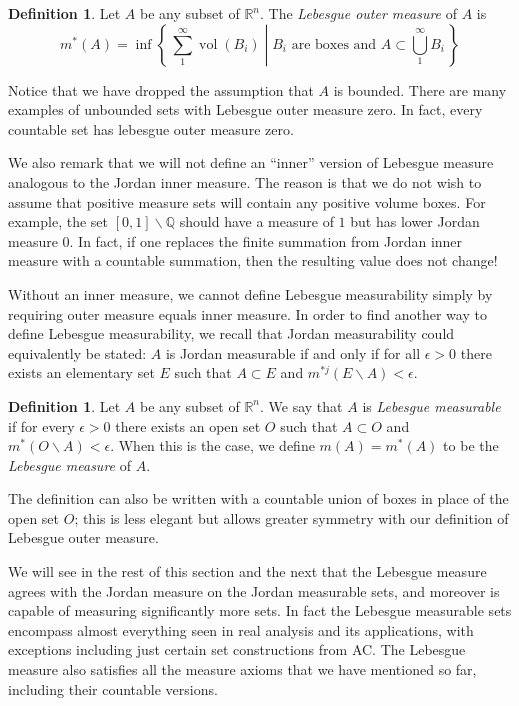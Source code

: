 \documentclass[11pt,oneside]{amsbook}
\newcommand{\set}[1]{\left\{\,#1\,\right\}}
\renewcommand{\setminus}{\smallsetminus}
\newcommand{\QQ}{{\mathbb Q}}
\newcommand{\RR}{{\mathbb R}}
\DeclareMathOperator{\vol}{vol}
\theoremstyle{definition}
\theoremstyle{plain}
\theoremstyle{definition}
\newtheorem{defn}[thm]{Definition}
\theoremstyle{remark}
\numberwithin{equation}{section}
\numberwithin{figure}{section}
\begin{document}
\begin{defn}
  Let $A$ be any subset of $\RR^n$. The \emph{Lebesgue outer measure} of $A$ is
  \[m^*(A)=\inf\set{\left.\sum_1^\infty \vol(B_i)\;\right|\;\text{$B_i$ are boxes and }A\subset\bigcup_1^\infty B_i}
  \]
\end{defn}

Notice that we have dropped the assumption that $A$ is bounded. There are many examples of unbounded sets with Lebesgue outer measure zero. In fact, every countable set has lebesgue outer measure zero.

We also remark that we will not define an ``inner'' version of Lebesgue measure analogous to the Jordan inner measure. The reason is that we do not wish to assume that positive measure sets will contain any positive volume boxes. For example, the set $[0,1]\setminus\QQ$ should have a measure of $1$ but has lower Jordan measure $0$. In fact, if one replaces the finite summation from Jordan inner measure with a countable summation, then the resulting value does not change!

Without an inner measure, we cannot define Lebesgue measurability simply by requiring outer measure equals inner measure. In order to find another way to define Lebesgue measurability, we recall that Jordan measurability could equivalently be stated: $A$ is Jordan measurable if and only if for all $\epsilon>0$ there exists an elementary set $E$ such that $A\subset E$ and $m^{*j}(E\setminus A)<\epsilon$.

\begin{defn}
  Let $A$ be any subset of $\RR^n$. We say that $A$ is \emph{Lebesgue measurable} if for every $\epsilon>0$ there exists an open set $O$ such that $A\subset O$ and $m^*(O\setminus A)<\epsilon$. When this is the case, we define $m(A)=m^*(A)$ to be the \emph{Lebesgue measure} of $A$.
\end{defn}

The definition can also be written with a countable union of boxes in place of the open set $O$; this is less elegant but allows greater symmetry with our definition of Lebesgue outer measure.

We will see in the rest of this section and the next that the Lebesgue measure agrees with the Jordan measure on the Jordan measurable sets, and moreover is capable of measuring significantly more sets. In fact the Lebesgue measurable sets encompass almost everything seen in real analysis and its applications, with exceptions including just certain set constructions from AC.  The Lebesgue measure also satisfies all the measure axioms that we have mentioned so far, including their countable versions.
\end{document}
